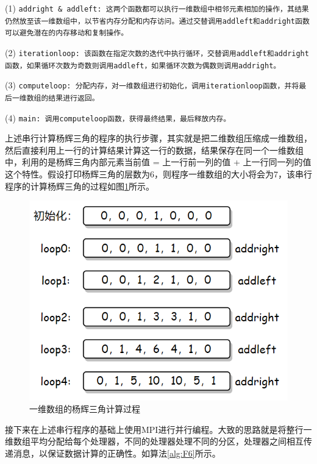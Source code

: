 \documentclass[supercite]{Experimental_Report}
\theoremstyle{definition}
\begin{document}
(1) \texttt{addright \& addleft: 这两个函数都可以执行一维数组中相邻元素相加的操作，其结果仍然放至该一维数组中，以节省内存分配和内存访问。通过交替调用addleft和addright函数可以避免潜在的内存移动和复制操作。}

(2) \texttt{iterationloop: 该函数在指定次数的迭代中执行循环，交替调用addleft和addright函数，如果循环次数为奇数则调用addleft，如果循环次数为偶数则调用addright。}

(3) \texttt{computeloop: 分配内存，对一维数组进行初始化，调用iterationloop函数，并将最后一维数组的结果进行返回。}

(4) \texttt{main: 调用computeloop函数，获得最终结果，最后释放内存。}

上述串行计算杨辉三角的程序的执行步骤，其实就是把二维数组压缩成一维数组，然后直接利用上一行的计算结果计算这一行的数据，结果保存在同一个一维数组中，利用的是杨辉三角内部元素当前值 = 上一行前一列的值 + 上一行同一列的值这个特性。假设打印杨辉三角的层数为6，则程序一维数组的大小将会为7，该串行程序的计算杨辉三角的过程如图\ref{fig:p4}所示。

\begin{figure}[ht]
\centering
\includegraphics[scale=0.8]{杨辉三角01.png}
\caption{一维数组的杨辉三角计算过程}
\label{fig:p4}
\end{figure}

接下来在上述串行程序的基础上使用MPI进行并行编程。大致的思路就是将整行一维数组平均分配给每个处理器，不同的处理器处理不同的分区，处理器之间相互传递消息，以保证数据计算的正确性。如算法\ref{alg:F6}所示。
\end{document}
